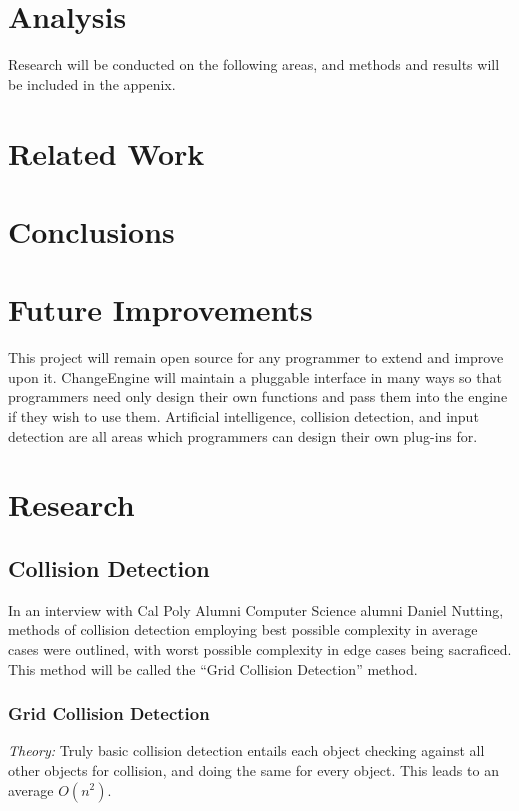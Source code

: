 \documentclass[12pt]{article}
\begin{document}
  \section{Analysis}
    Research will be conducted on the following areas, and methods and results will be included in the appenix.

  \section{Related Work}

  \section{Conclusions}

  \section{Future Improvements}
    This project will remain open source for any programmer to extend and improve upon it. ChangeEngine will maintain a pluggable interface in many ways so that programmers need only design their own functions and pass them into the engine if they wish to use them. Artificial intelligence, collision detection, and input detection are all areas which programmers can design their own plug-ins for.

  \newpage

  \appendix
  \section{Research}

  \subsection{Collision Detection}
    In an interview with Cal Poly Alumni Computer Science alumni Daniel Nutting, methods of collision detection employing best possible complexity in average cases were outlined, with worst possible complexity in edge cases being sacraficed. This method will be called the ``Grid Collision Detection'' method.

    \subsubsection{Grid Collision Detection}
      \emph{Theory: } Truly basic collision detection entails each object checking against all other objects for collision, and doing the same for every object. This leads to an average $O(n^2)$.
\end{document}
